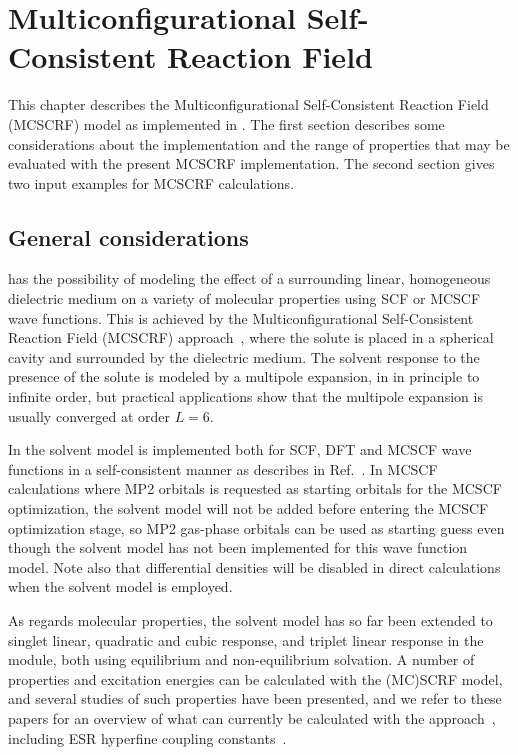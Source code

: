 \section{Multiconfigurational Self-Consistent Reaction Field}\label{sec:mcscrf}

This chapter describes the 
Multiconfigurational Self-Consistent Reaction Field (MCSCRF) model
as implemented in {\dalton}. The first section describes some
considerations about the implementation  and the range of
properties that may be evaluated with the present MCSCRF
implementation. The second section gives two input examples for
MCSCRF calculations.

\subsection{General considerations}\label{sec:solventimpl}

{\dalton} has the possibility of modeling the effect of a
surrounding linear, homogeneous dielectric
medium on a variety of molecular properties using
SCF or MCSCF
wave functions. This is achieved by the Multiconfigurational
Self-Consistent Reaction Field
(MCSCRF)
approach~\cite{kvmedpsjpc91,kvmhahjajthjcp89}, where the solute is
placed in a spherical cavity and surrounded by the
dielectric medium. The solvent response to the presence of the
solute is modeled by a multipole 
expansion, in {\dalton} in principle to infinite order, but
practical applications show that the multipole expansion is
usually converged at order $L=6$.

In {\dalton} the solvent model is implemented both for SCF, DFT and MCSCF wave
functions in a self-consistent manner as describes in
Ref.~\cite{kvmedpsjpc91,kvmhahjajthjcp89}. In MCSCF calculations where
MP2 orbitals is requested as starting orbitals for the MCSCF
optimization, the solvent model will not be added before entering the
MCSCF optimization stage, so MP2 gas-phase orbitals can be used as
starting guess even though the solvent model has not been implemented
for this wave function model. Note also that differential densities will be
disabled in direct calculations when the solvent model is employed.

As regards molecular properties, the solvent model has so far been
extended to singlet linear, quadratic and cubic response, and  triplet
linear response
in the {\resp} module, both using equilibrium and non-equilibrium
solvation. A number of properties and excitation energies can
be calculated with the (MC)SCRF model, and several studies of such
properties have been presented, and we refer to these papers for an
overview of what can currently be calculated with the
approach~\cite{kvmpjhjajjcp100,kvmylhapjjcp100}, including ESR
hyperfine coupling
constants~\cite{bfocobpjkvmjcp104}.

